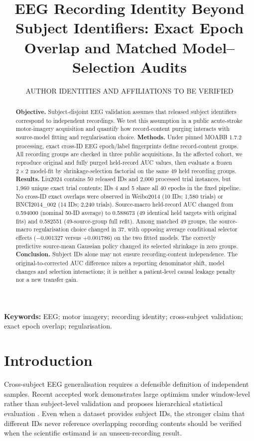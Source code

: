 \documentclass[11pt,a4paper]{article}
\title{EEG Recording Identity Beyond Subject Identifiers:
Exact Epoch Overlap and Matched Model--Selection Audits}
\author{AUTHOR IDENTITIES AND AFFILIATIONS TO BE VERIFIED}
\date{}
\begin{document}
\maketitle
\begin{abstract}
\textbf{Objective.} Subject-disjoint EEG validation assumes that released subject
identifiers correspond to independent recordings. We test this assumption in
a public acute-stroke motor-imagery acquisition and quantify how record-content
purging interacts with source-model fitting and regularisation choice.
\textbf{Methods.} Under pinned MOABB 1.7.2 processing, exact cross-ID EEG
epoch/label fingerprints define record-content groups. All recording groups
are checked in three public acquisitions. In the affected cohort, we
reproduce original and fully purged held-record AUC values, then evaluate
a frozen $2\times2$ model-fit by shrinkage-selection factorial on the same
49 held recording groups.
\textbf{Results.} Liu2024 contains 50 released IDs and 2,000 processed trial
instances, but 1,960 unique exact trial contents; IDs 4 and 5 share all
40 epochs in the fixed pipeline. No cross-ID exact overlaps were observed
in Weibo2014 (10 IDs; 1,580 trials) or BNCI2014\_002 (14 IDs; 2,240 trials).
Source-macro held-record AUC changed from 0.594000 (nominal 50-ID average)
to 0.588673 (49 identical held targets with original fits) and 0.582551
(49-source-group full refit). Among matched 49 groups, the source-macro
regularisation choice changed in 37, with opposing average conditional
selector effects ($-0.001327$ versus $+0.001786$) on the two fitted models.
The correctly predictive source-mean Gaussian policy changed its selected
shrinkage in zero groups.
\textbf{Conclusion.} Subject IDs alone may not ensure recording-content
independence. The original-to-corrected AUC difference mixes a reporting
denominator shift, model changes and selection interactions; it is neither
a patient-level causal leakage penalty nor a new transfer gain.
\end{abstract}

\noindent\textbf{Keywords:} EEG; motor imagery; recording identity;
cross-subject validation; exact epoch overlap; regularisation.

\section{Introduction}
Cross-subject EEG generalisation requires a defensible definition of
independent samples. Recent accepted work demonstrates large optimism
under window-level rather than subject-level validation and proposes
hierarchical statistical evaluation \cite{gil2026subjectvalidation}.
Even when a dataset provides subject IDs, the stronger claim that
different IDs never reference overlapping recording contents should be
verified when the scientific estimand is an unseen-recording result.
\end{document}
